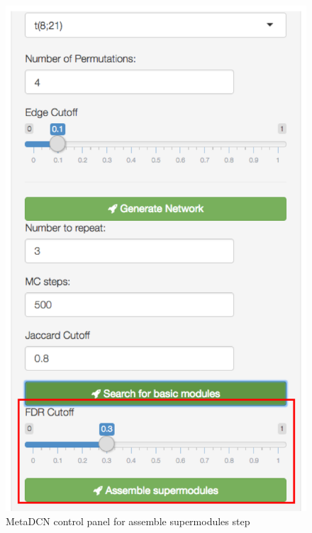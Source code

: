 \begin{steps}
\begin{figure}[H]
\begin{center}
\includegraphics[scale=0.45]{./figure/metaDCN/metaDCNstep3}
\caption{MetaDCN control panel for assemble supermodules step}
\label{fig:metaDCNstep3}
\end{center}
\end{figure}



\end{steps}

